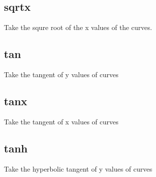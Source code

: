 \documentclass[letterpaper,10pt,english]{sphinxmanual}
\begin{document}
\subsection{sqrtx}
\label{\detokenize{math_operations:sqrtx}}
Take the squre root of the x values of the curves.

\begin{sphinxVerbatim}[commandchars=\\\{\}]
\PYG{p}{[}\PYG{p}{]}  
\end{sphinxVerbatim}


\subsection{tan}
\label{\detokenize{math_operations:tan}}
Take the tangent of y values of curves

\begin{sphinxVerbatim}[commandchars=\\\{\}]
\PYG{p}{[}\PYG{p}{]}  
\end{sphinxVerbatim}


\subsection{tanx}
\label{\detokenize{math_operations:tanx}}
Take the tangent of x values of curves

\begin{sphinxVerbatim}[commandchars=\\\{\}]
\PYG{p}{[}\PYG{p}{]}  
\end{sphinxVerbatim}


\subsection{tanh}
\label{\detokenize{math_operations:tanh}}
Take the hyperbolic tangent of y values of curves

\begin{sphinxVerbatim}[commandchars=\\\{\}]
\PYG{p}{[}\PYG{p}{]}  
\end{sphinxVerbatim}
\end{document}

